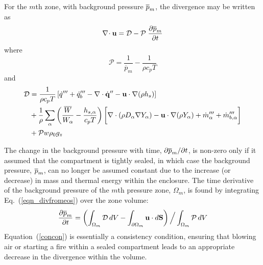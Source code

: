 For the $m$th zone, with background pressure $\overline{p}_m$, the divergence may be written as
\begin{equation}
\label{eqn_divfromeos}
\nabla\!\cdot {\bf u} = {\cal D} - {\cal P}\; \frac{\partial \overline{p}_m}{\partial t}
\end{equation}
where
\begin{equation}
\label{eqn_fdsP1}
\mathcal{P} = \frac{1}{\overline{p}_m} - \frac{1}{\rho c_p T}
\end{equation}
and
\begin{align}
\label{eqn_fdsD1}
\mathcal{D} &= \frac{1}{\rho c_p T}\left[ \dot{q}^{\prime\prime\prime} + \dot{q}_b^{\prime\prime\prime} - \nabla\cdot \dot{\mathbf{q}}^{\prime\prime} - \mathbf{u} \cdot\nabla (\rho h_s) \right] \notag\\
&+ \frac{1}{\rho} \sum_\alpha \left(\frac{\overline{W}}{W_\alpha} - \frac{h_{s,\alpha}}{c_p T} \right) \bigg[ \nabla\cdot (\rho D_\alpha \nabla Y_\alpha) - \mathbf{u} \cdot \nabla (\rho Y_\alpha) +\dot{m}_\alpha^{\prime\prime\prime} + \dot{m}_{b,\alpha}^{\prime\prime\prime} \bigg] \notag\\
&+ {\cal P} w \rho_0 g_z
\end{align}


The change in the background pressure with time, $\partial \overline{p}_m/\partial t$, is non-zero only if
it assumed that the compartment is tightly sealed, in which case the background pressure, $\overline{p}_m$, can no longer be assumed constant due to
the increase (or decrease) in mass and thermal energy within the enclosure. The time derivative of the background pressure of the $m$th
pressure zone, $\Omega_m$, is found by integrating Eq.~(\ref{eqn_divfromeos}) over the zone volume:
\begin{equation}
\frac{\partial \overline{p}_m}{\partial t} = \left( \int_{\Omega_m} {\cal D} \, dV - \int_{\partial \Omega_m} {\bf u} \cdot d{\bf S} \right) \Big/ \int_{\Omega_m} {\cal P} \, dV  \label{concon}
\end{equation}
Equation~(\ref{concon}) is essentially a consistency condition, ensuring that blowing air or starting a fire within a sealed
compartment leads to an appropriate decrease in the divergence within the volume.


